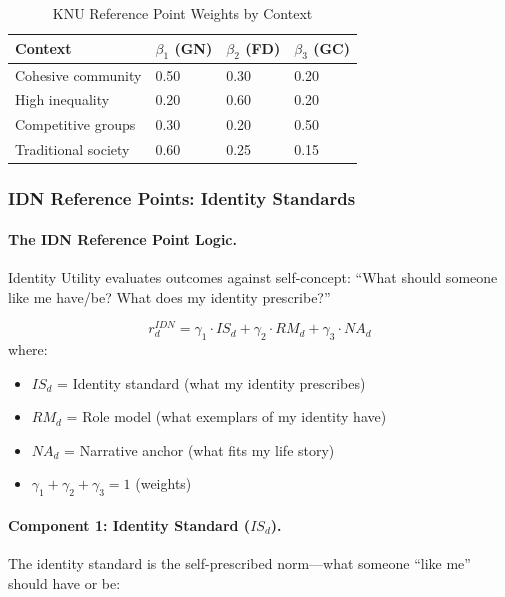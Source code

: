 \begin{table}[htbp]
\centering
\caption{KNU Reference Point Weights by Context}
\label{tab:knu-weights}
\renewcommand{\arraystretch}{1.3}
\begin{tabular}{@{}llll@{}}
\toprule
\textbf{Context} & $\beta_1$ (GN) & $\beta_2$ (FD) & $\beta_3$ (GC) \\
\midrule
Cohesive community & 0.50 & 0.30 & 0.20 \\
High inequality & 0.20 & 0.60 & 0.20 \\
Competitive groups & 0.30 & 0.20 & 0.50 \\
Traditional society & 0.60 & 0.25 & 0.15 \\
\bottomrule
\end{tabular}
\end{table}

\subsubsection{IDN Reference Points: Identity Standards}

\paragraph{The IDN Reference Point Logic.}
Identity Utility evaluates outcomes against self-concept:
``What should someone like me have/be? What does my identity prescribe?''

\begin{definition}
\label{def:idn-reference}
\begin{equation}
r^{IDN}_d = \gamma_1 \cdot IS_d + \gamma_2 \cdot RM_d + \gamma_3 \cdot NA_d
\end{equation}
where:
\begin{itemize}
\item $IS_d$ = Identity standard (what my identity prescribes)
\item $RM_d$ = Role model (what exemplars of my identity have)
\item $NA_d$ = Narrative anchor (what fits my life story)
\item $\gamma_1 + \gamma_2 + \gamma_3 = 1$ (weights)
\end{itemize}
\end{definition}

\paragraph{Component 1: Identity Standard ($IS_d$).}
The identity standard is the self-prescribed norm---what someone ``like me'' 
should have or be:

